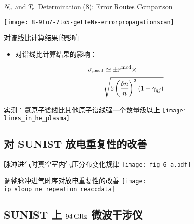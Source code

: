 \begin{CJK*}{UTF8}{kai}
\begin{frame}{$N_{\rm e}$ and $T_{\rm e}$ Determination (8): Error Routes Comparison}
	\vspace{-0.3cm}
	\begin{center}
		\texttt{[image: 8-9to7-7to5-getTeNe-errorpropagationscan]}
	\end{center}
\end{frame}


\begin{frame}{对谱线比计算结果的影响}
	\begin{itemize}
        \item 对谱线比计算结果的影响：
    \end{itemize}
    \begin{align*}
    \sigma_{r^{\rm mod}} & \simeq\pm r^{\rm mod}\times \\
    & \sqrt{2\left(\frac{\delta n}{n}\right)^2(1-\gamma_{qj})}
    \end{align*}

\end{frame}

\begin{frame}{实测：氦原子谱线比其他原子谱线强一个数量级以上}
	\centering
	\texttt{[image: lines\_in\_he\_plasma]}
\end{frame}

\subsection{对 SUNIST 放电重复性的改善}

\begin{frame}{脉冲进气时真空室内气压分布变化规律}
	\centering
	\texttt{[image: fig\_6\_a.pdf]}\\
\end{frame}

\begin{frame}{调整脉冲进气时序对放电重复性的改善}
	\centering
	\texttt{[image: ip\_vloop\_ne\_repeation\_reacqdata]}
\end{frame}

\subsection{SUNIST 上 $94\,{\rm GHz}$ 微波干涉仪}


\end{CJK*}
